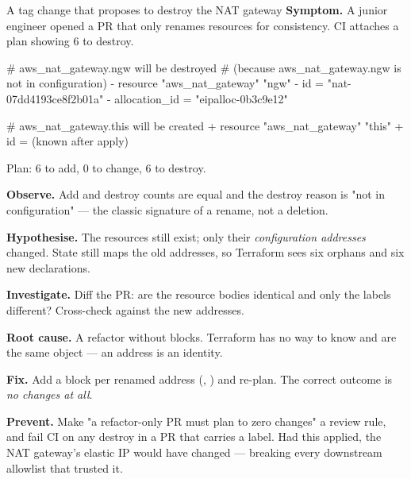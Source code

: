 \begin{debuglab}{A tag change that proposes to destroy the NAT gateway}
\textbf{Symptom.} A junior engineer opened a PR that only renames resources for consistency. CI attaches a plan showing 6 to destroy.

\begin{planbox}
  # aws_nat_gateway.ngw will be destroyed
  # (because aws_nat_gateway.ngw is not in configuration)
- resource "aws_nat_gateway" "ngw" {
    - id            = "nat-07dd4193ce8f2b01a"
    - allocation_id = "eipalloc-0b3c9e12"
  }

  # aws_nat_gateway.this will be created
+ resource "aws_nat_gateway" "this" {
    + id            = (known after apply)
  }

Plan: 6 to add, 0 to change, 6 to destroy.
\end{planbox}

\begin{tickcheck}
  \item \textbf{Observe.} Add and destroy counts are equal and the destroy reason is "not in configuration" --- the classic signature of a rename, not a deletion.
  \item \textbf{Hypothesise.} The resources still exist; only their \emph{configuration addresses} changed. State still maps the old addresses, so Terraform sees six orphans and six new declarations.
  \item \textbf{Investigate.} Diff the PR: are the resource bodies identical and only the labels different? Cross-check  against the new addresses.
  \item \textbf{Root cause.} A refactor without  blocks. Terraform has no way to know  and  are the same object --- an address is an identity.
  \item \textbf{Fix.} Add a  block per renamed address (, ) and re-plan. The correct outcome is \emph{no changes at all}.
  \item \textbf{Prevent.} Make "a refactor-only PR must plan to zero changes" a review rule, and fail CI on any destroy in a PR that carries a  label. Had this applied, the NAT gateway's elastic IP would have changed --- breaking every downstream allowlist that trusted it.
\end{tickcheck}
\end{debuglab}

